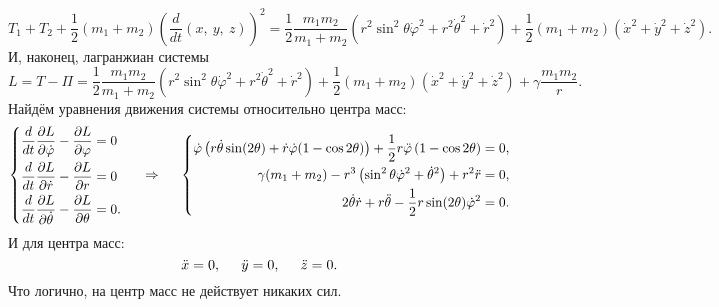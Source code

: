 \begin{equation*}
    T_1 + T_2 + \frac{1}{2} (m_1+m_2) \left(\frac{d}{dt} (x, \ y, \ z)\right)^2 =
    \frac{1}{2} \frac{m_1 m_2}{m_1 + m_2} 
    \left(
        r^2 \sin^2 \theta \dot{\varphi}^2 + r^2 \dot{\theta}^2 + \dot{r}^2
    \right) + 
    \frac{1}{2} (m_1+m_2) \left(\dot{x}^2 + \dot{y}^2 + \dot{z}^2\right).
\end{equation*}
И, наконец, лагранжиан системы
\begin{equation}
    L = T - \Pi = \frac{1}{2} \frac{m_1 m_2}{m_1 + m_2} 
    \left(
        r^2 \sin^2 \theta \dot{\varphi}^2 + r^2 \dot{\theta}^2 + \dot{r}^2
    \right) + 
    \frac{1}{2} (m_1+m_2) \left(\dot{x}^2 + \dot{y}^2 + \dot{z}^2\right)
    + \gamma \frac{m_1 m_2}{r}.
\end{equation}
Найдём уравнения движения системы относительно центра масс:
\begin{equation}
    \left\{\begin{aligned}
        \frac{d }{d t} \frac{\partial L}{\partial \dot{\varphi}} - \frac{\partial L}{\partial \varphi} &= 0 \\
        \frac{d }{d t} \frac{\partial L}{\partial \dot{r}} - \frac{\partial L}{\partial r} &= 0 \\
        \frac{d }{d t} \frac{\partial L}{\partial \dot{\theta}} - \frac{\partial L}{\partial \theta} &= 0.
    \end{aligned}\right.
    \hspace{0.5cm} \Rightarrow \hspace{0.5cm} 
    \left\{\begin{aligned}
        \dot{\varphi} \left(
        r  \dot{\theta} \sin (2 \theta) + \dot{r} \dot{\varphi} (1 - \cos 2 \theta)
    \right) 
    + \frac{1}{2} r \ddot{\varphi} \left(
         1 - \cos 2 \theta
    \right) = 0, 
    \\
        \gamma (m_1 + m_2) - r^3
    \left(
        \sin^2 \theta \dot{\varphi}^2 + \dot{\theta}^2
    \right) + r^2 \ddot{r} = 0,
    \\
    2 \dot{\theta} \dot{r} + r \ddot{\theta} - \frac{1}{2} r \sin (2 \theta) \dot{\varphi}^2 = 0.
    \end{aligned}\right.
\end{equation}
И для центра масс:
\begin{equation}
    \ddot{x} = 0, \hspace{0.5cm} 
    \ddot{y} = 0, \hspace{0.5cm} 
    \ddot{z} = 0.
\end{equation}
Что логично, на центр масс не действует никаких сил.

